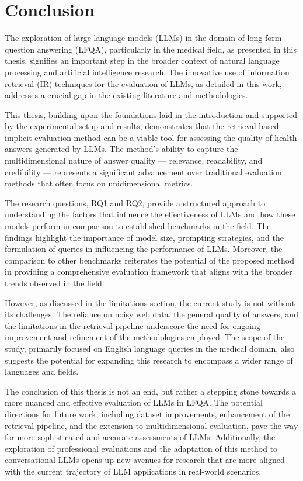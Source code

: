 \section{Conclusion}
The exploration of large language models (LLMs) in the domain of long-form question answering (LFQA), particularly in the medical field, as presented in this thesis, signifies an important step in the broader context of natural language processing and artificial intelligence research.
The innovative use of information retrieval (IR) techniques for the evaluation of LLMs, as detailed in this work, addresses a crucial gap in the existing literature and methodologies.

This thesis, building upon the foundations laid in the introduction and supported by the experimental setup and results, demonstrates that the retrieval-based implicit evaluation method can be a viable tool for assessing the quality of health answers generated by LLMs.
The method's ability to capture the multidimensional nature of answer quality — relevance, readability, and credibility — represents a significant advancement over traditional evaluation methods that often focus on unidimensional metrics.

The research questions, RQ1 and RQ2, provide a structured approach to understanding the factors that influence the effectiveness of LLMs and how these models perform in comparison to established benchmarks in the field.
The findings highlight the importance of model size, prompting strategies, and the formulation of queries in influencing the performance of LLMs.
Moreover, the comparison to other benchmarks reiterates the potential of the proposed method in providing a comprehensive evaluation framework that aligns with the broader trends observed in the field.

However, as discussed in the limitations section, the current study is not without its challenges.
The reliance on noisy web data, the general quality of answers, and the limitations in the retrieval pipeline underscore the need for ongoing improvement and refinement of the methodologies employed.
The scope of the study, primarily focused on English language queries in the medical domain, also suggests the potential for expanding this research to encompass a wider range of languages and fields.

The conclusion of this thesis is not an end, but rather a stepping stone towards a more nuanced and effective evaluation of LLMs in LFQA.
The potential directions for future work, including dataset improvements, enhancement of the retrieval pipeline, and the extension to multidimensional evaluation, pave the way for more sophisticated and accurate assessments of LLMs.
Additionally, the exploration of professional evaluations and the adaptation of this method to conversational LLMs opens up new avenues for research that are more aligned with the current trajectory of LLM applications in real-world scenarios.


